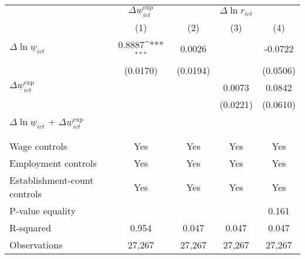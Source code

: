 {
\def\sym#1{\ifmmode^{#1}\else\(^{#1}\)\fi}
\begin{tabular}{l*{4}{c}}
\hline\hline
          &\multicolumn{1}{c}{$\Delta \underline{w}_{ict}^{\text{exp}}$}&\multicolumn{3}{c}{$\Delta \ln r_{ict}$}                \\\cmidrule(lr){2-2}\cmidrule(lr){3-5}
          &\multicolumn{1}{c}{(1)}         &\multicolumn{1}{c}{(2)}         &\multicolumn{1}{c}{(3)}         &\multicolumn{1}{c}{(4)}         \\
\hline
$\Delta \ln \underline{w}_{ict}$&   0.8887\sym{***}&   0.0026         &                  &  -0.0722         \\
          & (0.0170)         & (0.0194)         &                  & (0.0506)         \\
[1em]
$\Delta \underline{w}_{ict}^{\text{exp}}$&                  &                  &   0.0073         &   0.0842         \\
          &                  &                  & (0.0221)         & (0.0610)         \\
\hline
$\Delta \ln \underline{w}_{ict}$ + $\Delta \underline{w}_{ict}^{\text{exp}}$&                  &                  &                  &                  \\
          &                  &                  &                  &                  \\
\vspace{-2mm}&                  &                  &                  &                  \\
Wage controls&      Yes         &      Yes         &      Yes         &      Yes         \\
Employment controls&      Yes         &      Yes         &      Yes         &      Yes         \\
Establishment-count controls&      Yes         &      Yes         &      Yes         &      Yes         \\
P-value equality&                  &                  &                  &    0.161         \\
R-squared &    0.954         &    0.047         &    0.047         &    0.047         \\
Observations&   27,267         &   27,267         &   27,267         &   27,267         \\
\hline\hline
\end{tabular}
}

